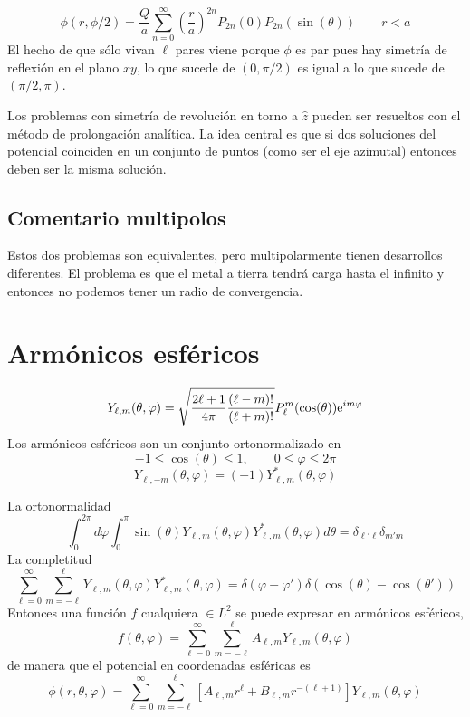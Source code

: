 \documentclass[10pt,oneside]{CBFT_book}
\begin{document}
\[
	\phi(r,\phi/2) = \frac{Q}{a} \sum_{n=0}^\infty \left( \frac{r}{a}\right)^{2n} P_{2n} (0) P_{2n} 
	(\sin(\theta)) \qquad r < a
\]
El hecho de que sólo vivan $\ell$ pares viene porque $\phi$ es par pues hay simetría de reflexión en el
plano $xy$, lo que sucede de $(0,\pi/2)$ es igual a lo que sucede de $(\pi/2, \pi)$.

Los problemas con simetría de revolución en torno a $\hat{z}$ pueden ser resueltos con el método de
prolongación analítica. La idea central es que si dos soluciones del potencial coinciden en un conjunto
de puntos (como ser el eje azimutal) entonces deben ser la misma solución.

\subsection{Comentario multipolos}

Estos dos problemas son equivalentes, pero multipolarmente tienen desarrollos diferentes.
El problema es que el metal a tierra tendrá carga hasta el infinito y entonces no podemos tener un
radio de convergencia.


\section{Armónicos esféricos}

\[
	Y_{\ell,m}(\theta,\varphi) = \sqrt{ \frac{ 2\ell + 1}{4\pi} \frac{(\ell-m)! }{(\ell+ m)! } }
	P_\ell^m(\cos(\theta)) \mathrm{e}^{i m \varphi}
\]
Los armónicos esféricos son un conjunto ortonormalizado en 
\[
	- 1 \leq \cos(\theta) \leq 1 , \qquad 0 \leq \varphi \leq 2\pi
\]
\[
	Y_{\ell,-m}(\theta,\varphi) = (-1) Y_{\ell,m}^*(\theta,\varphi)
\]

La ortonormalidad
\[
	\int_0^{2\pi} d\varphi \int_0^\pi \sin(\theta) Y_{\ell,m}(\theta,\varphi) Y_{\ell,m}^*(\theta,\varphi) d\theta 
	= \delta_{\ell'\ell}\delta_{m'm}
\]
La completitud
\[
	\sum_{\ell=0}^\infty \sum_{m=-\ell}^\ell Y_{\ell,m}(\theta,\varphi) Y_{\ell,m}^*(\theta,\varphi) = 
\delta(\varphi 	-\varphi') \delta(\cos(\theta)-\cos(\theta'))
\]
Entonces una función $f$ cualquiera $\in L^2$ se puede expresar en armónicos esféricos,
\[
	f(\theta,\varphi) = \sum_{\ell=0}^\infty \sum_{m=-\ell}^\ell A_{\ell,m} Y_{\ell,m}(\theta,\varphi)
\]
de manera que el potencial en coordenadas esféricas es
\[
	\phi(r,\theta,\varphi) = \sum_{\ell=0}^\infty \sum_{m=-\ell}^\ell [A_{\ell,m}r^\ell + B_{\ell,m} r^{-(\ell+1)}] 
	Y_{\ell,m}(\theta,\varphi)
\]
\end{document}
